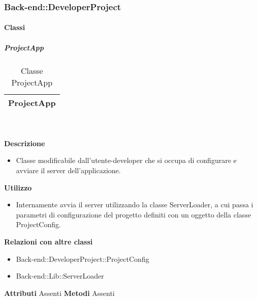 
	
	\subsubsection{Back-end::DeveloperProject} 
		\paragraph{Classi}
			\subparagraph{ProjectApp} 
\begin{table}[ht]
\begin{center}
\bgroup
	\setlength{\arrayrulewidth}{0.6mm}
	\def\arraystretch{1}
		\begin{tabular}{ | p{12cm} | }
				\hline  
					\centerline{\textbf{ProjectApp}}
		\\ \hline 
				\hline
				\hline
		
		\end{tabular}
\egroup
\caption{Classe ProjectApp}
\end{center}
\end{table} \textbf{\\ \\ Descrizione}
\begin{itemize}
\item[] Classe modificabile dall'utente-developer che si occupa di configurare e avviare il server dell'applicazione.
\end{itemize} 
\textbf{Utilizzo}
\begin{itemize}
\item[] Internamente avvia il server utilizzando la classe ServerLoader, a cui passa i parametri di configurazione del progetto definiti con un oggetto della classe ProjectConfig.
\end{itemize}
\textbf{Relazioni con altre classi}
\begin{itemize}
\item{Back-end::DeveloperProject::ProjectConfig}
\item{Back-end::Lib::ServerLoader}
\end{itemize}
\textbf{Attributi}
Assenti
\textbf{Metodi}
Assenti

